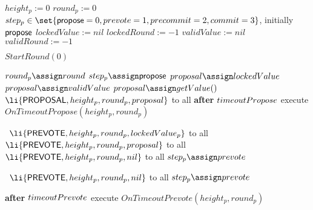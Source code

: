 \begin{algorithm}[htb!]
\def\baselinestretch{1}
\scriptsize\raggedright
\begin{algorithmic}[1]
\SHORTSPACE
\INIT{}
  \STATE $height_p := 0$ 
  \STATE $round_p := 0$    
  \STATE $step_p  \in \set{\propose=0, \prevote=1, \precommit=2, \commit=3}$, initially $\mathsf{propose}$   
  \STATE $lockedValue := nil$
  \STATE $lockedRound := -1$ 
  \STATE $validValue := nil$
  \STATE $validRound := -1$
\ENDINIT

\SPACE
{}
  \STATE $StartRound(0)$
\ENDUPON

\SPACE
{} \label{line:tab:startRound}
\STATE $round_p \assign round$
\STATE $step_p \assign \propose$
		\STATE $proposal \assign lockedValue$
		\STATE $proposal \assign validValue$
	\ELSE
		\STATE $proposal \assign getValue()$	
	\ENDIF 	  
	\STATE \PBroadcast\ $\li{\Proposal,height_p, round_p, proposal}$ to all \label{line:tab:send-proposal}
\ENDIF
\STATE \textbf{after} $timeoutPropose$ execute $OnTimeoutPropose(height_p, round_p)$
\ENDFUNCTION

\SPACE
{} \label{line:tab:recvProposal} 
   \label{line:tab:hasLockedValue}
 	\STATE \PBroadcast \ $\li{\Prevote,height_p,round_p,lockedValue_p}$ to all \label{line:tab:send-locked-value}
  \label{line:tab:locked-value-nil} 
   \STATE \PBroadcast \ $\li{\Prevote,height_p,round_p,proposal}$ to all \label{line:tab:send-prevote}
 \ELSE
   \STATE \PBroadcast \ $\li{\Prevote,height_p,round_p,\nil}$ to all \label{line:tab:send-prevote-nil}	
 \ENDIF
 \STATE $step_p \assign \prevote$ \label{line:tab:setStateToPrevote}
\ENDUPON

\SPACE
{} \label{line:tab:onTimeoutPropose}
	\STATE \PBroadcast \ $\li{\Prevote,height_p,round_p,\nil}$ to all 
	\STATE $step_p \assign \prevote$  
\ENDIF	
\ENDFUNCTION

\SPACE
{} \label{line:tab:recvAny2/3Prevote}
	\STATE \textbf{after} $timeoutPrevote$ execute $OnTimeoutPrevote(height_p, round_p)$ \label{line:tab:timeoutPrevote}
\ENDUPON


\end{algorithmic}
\end{algorithm}
